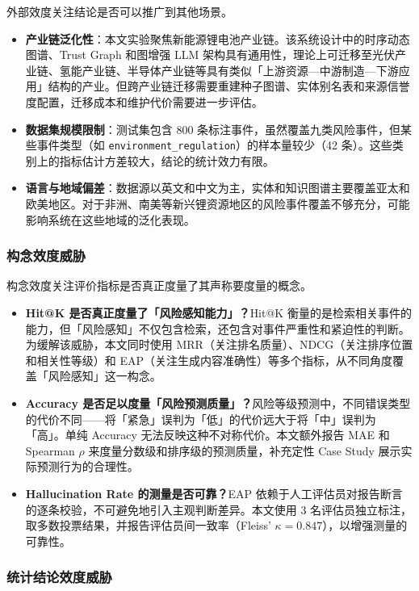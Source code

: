 \documentclass[12pt,a4paper]{article}
\newcommand{\term}[1]{\textbf{#1}}
\begin{document}
外部效度关注结论是否可以推广到其他场景。

\begin{itemize}
    \item \term{产业链泛化性}：本文实验聚焦新能源锂电池产业链。该系统设计中的时序动态图谱、Trust Graph 和图增强 LLM 架构具有通用性，理论上可迁移至光伏产业链、氢能产业链、半导体产业链等具有类似「上游资源—中游制造—下游应用」结构的产业。但跨产业链迁移需要重建种子图谱、实体别名表和来源信誉度配置，迁移成本和维护代价需要进一步评估。
    \item \term{数据集规模限制}：测试集包含 800 条标注事件，虽然覆盖九类风险事件，但某些事件类型（如 \texttt{environment\_regulation}）的样本量较少（42 条）。这些类别上的指标估计方差较大，结论的统计效力有限。
    \item \term{语言与地域偏差}：数据源以英文和中文为主，实体和知识图谱主要覆盖亚太和欧美地区。对于非洲、南美等新兴锂资源地区的风险事件覆盖不够充分，可能影响系统在这些地域的泛化表现。
\end{itemize}

\subsubsection{构念效度威胁}

构念效度关注评价指标是否真正度量了其声称要度量的概念。

\begin{itemize}
    \item \term{Hit@K 是否真正度量了「风险感知能力」？}Hit@K 衡量的是检索相关事件的能力，但「风险感知」不仅包含检索，还包含对事件严重性和紧迫性的判断。为缓解该威胁，本文同时使用 MRR（关注排名质量）、NDCG（关注排序位置和相关性等级）和 EAP（关注生成内容准确性）等多个指标，从不同角度覆盖「风险感知」这一构念。
    \item \term{Accuracy 是否足以度量「风险预测质量」？}风险等级预测中，不同错误类型的代价不同——将「紧急」误判为「低」的代价远大于将「中」误判为「高」。单纯 Accuracy 无法反映这种不对称代价。本文额外报告 MAE 和 Spearman $\rho$ 来度量分数级和排序级的预测质量，补充定性 Case Study 展示实际预测行为的合理性。
    \item \term{Hallucination Rate 的测量是否可靠？}EAP 依赖于人工评估员对报告断言的逐条校验，不可避免地引入主观判断差异。本文使用 3 名评估员独立标注，取多数投票结果，并报告评估员间一致率（Fleiss' $\kappa = 0.847$），以增强测量的可靠性。
\end{itemize}

\subsubsection{统计结论效度威胁}
\end{document}
